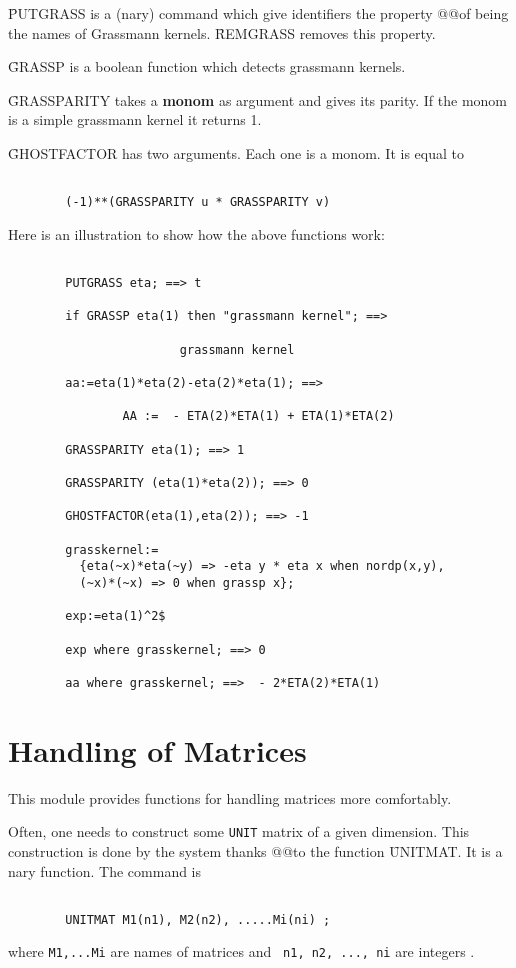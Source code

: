 \f{PUTGRASS} is a (nary) command which give identifiers the property
@@of being the names of Grassmann kernels. \f{REMGRASS} removes this property.

\f{GRASSP} is a boolean function which detects grassmann kernels.

\f{GRASSPARITY} takes a {\bf monom}  as argument and gives its parity.
If the monom is a simple grassmann kernel it returns 1.

\f{GHOSTFACTOR} has two arguments. Each one is a monom. It is equal to
\begin{verbatim}

        (-1)**(GRASSPARITY u * GRASSPARITY v)

\end{verbatim}
Here is an illustration to show how the above functions work:
\begin{verbatim}

        PUTGRASS eta; ==> t

        if GRASSP eta(1) then "grassmann kernel"; ==>

                        grassmann kernel

        aa:=eta(1)*eta(2)-eta(2)*eta(1); ==>

                AA :=  - ETA(2)*ETA(1) + ETA(1)*ETA(2)

        GRASSPARITY eta(1); ==> 1

        GRASSPARITY (eta(1)*eta(2)); ==> 0

        GHOSTFACTOR(eta(1),eta(2)); ==> -1

        grasskernel:=
          {eta(~x)*eta(~y) => -eta y * eta x when nordp(x,y),
          (~x)*(~x) => 0 when grassp x};

        exp:=eta(1)^2$

        exp where grasskernel; ==> 0

        aa where grasskernel; ==>  - 2*ETA(2)*ETA(1)

\end{verbatim}
\section{Handling of Matrices}
This module provides functions for handling matrices more comfortably.
\bi
\item[i.]
Often, one needs to construct some {\tt UNIT} matrix of
a given dimension. This construction is done by the system thanks
@@to the function \f{UNITMAT}. It is a nary function. The command is
\begin{verbatim}

        UNITMAT M1(n1), M2(n2), .....Mi(ni) ;

\end{verbatim}
where \verb+M1,...Mi+ are names of matrices and
\verb+ n1, n2, ..., ni+ are integers .

